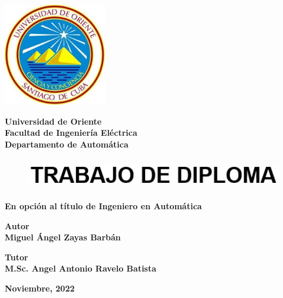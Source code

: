 \pagestyle{empty}

\begin{titlepage}
    \begin{center}
        \includegraphics[width = 4.5cm, height = 4.5cm]{imagenes/uo.jpg}
    \end{center}
    \begin{center}
        \textbf{\Large Universidad de Oriente\\
        Facultad de Ingeniería Eléctrica}\\
        \textbf{Departamento de Automática}
    \end{center}

    \vspace{1cm}
   
    \begin{center}
        \begin{figure}[h]
            \centering
            \includegraphics[width=14cm, height=1.4cm]{imagenes/trabajo de diploma.jpg}
        \end{figure}
        \textbf{\large En opción al título de Ingeniero en Automática}
    \end{center}

    \vspace{1cm}
    \begin{center}
        \textbf{\LARGE Autor}\\
        \textbf{\Large Miguel Ángel Zayas Barbán}
    \end{center}
    \vspace{1cm}
    \begin{center}
        \textbf{\LARGE Tutor}\\
        \textbf{\Large M.Sc. Angel Antonio Ravelo Batista}
    \end{center}

    \begin{center}
        \vfill
        \textbf{\large Noviembre, 2022}
    \end{center}


\end{titlepage}

